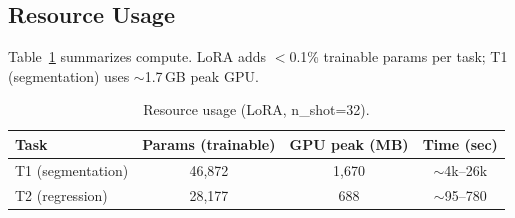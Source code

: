 \subsection{Resource Usage}
\label{sec:resource}

Table~\ref{tab:resource} summarizes compute. LoRA adds $<$0.1\% trainable params per task; T1 (segmentation) uses $\sim$1.7\,GB peak GPU.

\begin{table}[t]
\caption{Resource usage (LoRA, n\_shot=32).}
\label{tab:resource}
\centering
\begin{tabular}{lccc}
\toprule
Task & Params (trainable) & GPU peak (MB) & Time (sec) \\
\midrule
T1 (segmentation) & 46,872 & 1,670 & $\sim$4k--26k \\
T2 (regression) & 28,177 & 688 & $\sim$95--780 \\
\bottomrule
\end{tabular}
\end{table}
